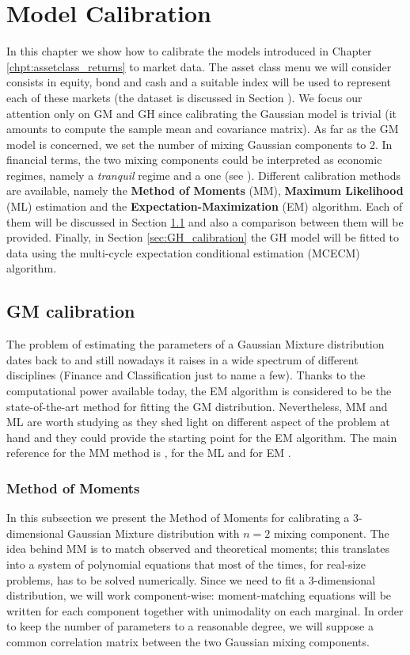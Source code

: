 \chapter{Model Calibration}
In this chapter we show how to calibrate the models introduced in Chapter \ref{chpt:assetclass_returns} to market data. The asset class menu we will consider consists in equity, bond and cash and a suitable index will be used to represent each of these markets (the dataset is discussed in Section ). We focus our attention only on GM and GH since calibrating the Gaussian model is trivial (it amounts to compute the sample mean and covariance matrix). As far as the GM model is concerned, we set the number of mixing Gaussian components to 2. In financial terms, the two mixing components could be interpreted as economic regimes, namely a \textit{tranquil} regime and a  one (see \cite{Brey2013}). Different calibration methods are available, namely the \textbf{Method of Moments} (MM), \textbf{Maximum Likelihood} (ML) estimation  and the \textbf{Expectation-Maximization} (EM) algorithm. Each of them will be discussed in Section \ref{sec:GM_calibration} and also a comparison between them will be provided. Finally, in Section \ref{sec:GH_calibration} the GH model will be fitted to data using the multi-cycle expectation conditional estimation (MCECM) algorithm. 
\section{GM calibration} \label{sec:GM_calibration}
The problem of estimating the parameters of a Gaussian Mixture distribution dates back to \cite{Pearson1894} and still nowadays it raises in a wide spectrum of different disciplines (Finance and Classification just to name a few). Thanks to the computational power available today, the EM algorithm is considered to be the state-of-the-art method for fitting the GM distribution. Nevertheless, MM and ML are worth studying as they shed light on different aspect of the problem at hand and they could provide the starting point for the EM algorithm. The main reference for the MM method is \cite{Everitt81}, for the ML \cite{casella2002} and for EM \cite{McNeil2005}.
\subsection{Method of Moments}\label{subsec:MM}
In this subsection we present the Method of Moments for calibrating a 3-dimensional Gaussian Mixture distribution with $n=2$ mixing component. The idea behind MM is to match observed and theoretical moments; this translates into a system of polynomial equations that most of the times, for real-size problems, has to be solved numerically. Since we need to fit a 3-dimensional distribution, we will work component-wise: moment-matching equations will be written  for each component together with unimodality on each marginal. In order to keep the number of parameters to a reasonable degree, we will suppose a common correlation matrix between the two Gaussian mixing components.

